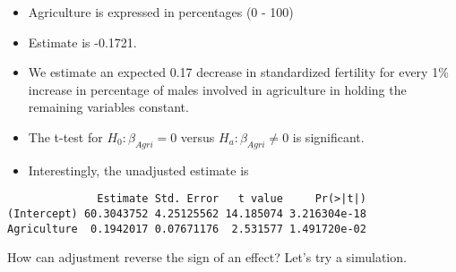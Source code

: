 \documentclass[12pt,openright,oneside,a4paper,chapter=TITLE,section=TITLE,subsection=Title,english,french,spanish,portugues,sumario=tradicional]{04-class-files/abntex2}
\newenvironment{Shaded}{\begin{snugshade}}{\end{snugshade}}
\newcommand{\DataTypeTok}[1]{\textcolor[rgb]{0.13,0.29,0.53}{#1}}
\newcommand{\DecValTok}[1]{\textcolor[rgb]{0.00,0.00,0.81}{#1}}
\newcommand{\FloatTok}[1]{\textcolor[rgb]{0.00,0.00,0.81}{#1}}
\newcommand{\KeywordTok}[1]{\textcolor[rgb]{0.13,0.29,0.53}{\textbf{#1}}}
\newcommand{\NormalTok}[1]{#1}
\newcommand{\OperatorTok}[1]{\textcolor[rgb]{0.81,0.36,0.00}{\textbf{#1}}}
\newcommand{\StringTok}[1]{\textcolor[rgb]{0.31,0.60,0.02}{#1}}
\providecommand{\tightlist}{%
  \setlength{\itemsep}{0pt}\setlength{\parskip}{0pt}}
\begin{document}
\begin{itemize}
\tightlist
\item
  Agriculture is expressed in percentages (0 - 100)
\item
  Estimate is -0.1721.
\item
  We estimate an expected 0.17 decrease in standardized fertility for every 1\% increase in percentage of males involved in agriculture in holding the remaining variables constant.
\item
  The t-test for \(H_0: \beta_{Agri} = 0\) versus \(H_a: \beta_{Agri} \neq 0\) is significant.
\item
  Interestingly, the unadjusted estimate is
\end{itemize}

\begin{Shaded}
\end{Shaded}

\begin{verbatim}
              Estimate Std. Error   t value     Pr(>|t|)
(Intercept) 60.3043752 4.25125562 14.185074 3.216304e-18
Agriculture  0.1942017 0.07671176  2.531577 1.491720e-02
\end{verbatim}

How can adjustment reverse the sign of an effect? Let's try a simulation.

\begin{Shaded}
\end{Shaded}
\end{document}
